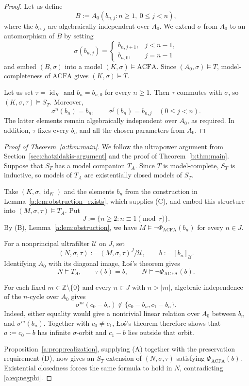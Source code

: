 \documentclass[10pt,a4paper]{amsart}
\renewcommand{\geq}{\geqslant}
\renewcommand{\leq}{\leqslant}
\renewcommand{\ge}{\geqslant}
\theoremstyle{definition}
\newcommand{\Z}{\mathbb Z}
\DeclareMathOperator{\id}{id}
\newcommand{\ACFA}{\mathrm{ACFA}}
\begin{document}
\begin{proof}
Let us define
\[
B:=A_0(b_{n,j}:n\geq1,\ 0\leq j<n),
\]
where the $b_{n,j}$ are algebraically independent over $A_0$.  
We extend $\sigma$ from $A_0$ to an automorphism of $B$ by setting
\[
\sigma(b_{n,j})=
\begin{cases}
b_{n,j+1},&j<n-1,\\
b_{n,0},&j=n-1
\end{cases}
\]
and embed $(B,\sigma)$ into a model $(K,\sigma)\models\ACFA$.
Since $(A_0,\sigma)\models T$, model-completeness of $\ACFA$
gives $(K,\sigma)\models T$.

Let us set $\tau=\id_K$ and $b_n=b_{n,0}$ for every $n\geq1$.
Then $\tau$ commutes with $\sigma$, so
$(K,\sigma,\tau)\models S_T$.
Moreover,
\[
\sigma^n(b_n)=b_n,
\qquad
\sigma^j(b_n)=b_{n,j}\quad(0\leq j<n).
\]
The latter elements remain algebraically independent over $A_0$,
as required. In addition, $\tau$ fixes every $b_n$ and all the chosen parameters
from $A_0$.
\end{proof}
\begin{proof}[Proof of Theorem~\ref{a:thm:main}]
We follow the ultrapower argument from
Section~\ref{sec:chatzidakis-argument} and the proof of
Theorem~\ref{b:thm:main}.
Suppose that $S_T$ has a model companion $T_A$.
Since $T$ is model-complete, $S_T$ is inductive, so models
of $T_A$ are existentially closed models of $S_T$.

Take $(K,\sigma,\id_K)$ and the elements $b_n$ from the
construction in Lemma~\ref{a:lem:obstruction_exists},
which supplies (C), and embed this structure into
$(M,\sigma,\tau)\models T_A$.
Put
\[
J:=\{n\ge2:n\equiv1\pmod r\}.
\]
By (B), Lemma~\ref{a:lem:obstruction}, we have
$M\models\neg\Phi_{\mathrm{ACFA}}(b_n)$ for every $n\in J$.

For a nonprincipal ultrafilter $\mathcal U$ on $J$, set
\[
(N,\sigma,\tau):=(M,\sigma,\tau)^J/\mathcal U,
\qquad b:=[b_n]_{\mathcal U}.
\]
Identifying $A_0$ with its diagonal image, \L o\'s's theorem gives
\begin{equation}\label{a:eq:negphi}
N\models T_A,\qquad \tau(b)=b,\qquad
N\models\neg\Phi_{\mathrm{ACFA}}(b).
\end{equation}

For each fixed $m\in\Z\setminus\{0\}$ and every $n\in J$
with $n>|m|$, algebraic independence of the $n$-cycle
over $A_0$ gives
\[
\sigma^m(c_0-b_n)\notin\{c_0-b_n,c_1-b_n\}.
\]
Indeed, either equality would give a nontrivial linear
relation over $A_0$ between $b_n$ and $\sigma^m(b_n)$.
Together with $c_0\ne c_1$, \L o\'s's theorem therefore
shows that $a:=c_0-b$ has infinite $\sigma$-orbit and
$c_1-b$ lies outside that orbit.

Proposition~\ref{a:prop:realization}, supplying (A) together
with the preservation requirement (D), now gives an
$S_T$-extension of $(N,\sigma,\tau)$ satisfying
$\Phi_{\mathrm{ACFA}}(b)$.
Existential closedness forces the same formula to hold
in $N$, contradicting \eqref{a:eq:negphi}.
\end{proof}
\end{document}
